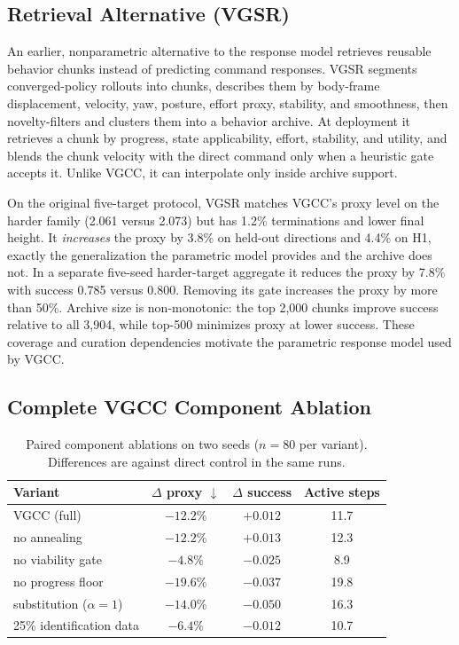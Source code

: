 \subsection{Retrieval Alternative (VGSR)}
\label{app:retrieval}

An earlier, nonparametric alternative to the response model retrieves reusable
behavior chunks instead of predicting command responses. VGSR segments
converged-policy rollouts into chunks, describes them by body-frame displacement,
velocity, yaw, posture, effort proxy, stability, and smoothness, then
novelty-filters and clusters them into a behavior archive. At deployment it
retrieves a chunk by progress, state applicability, effort, stability, and utility,
and blends the chunk velocity with the direct command only when a heuristic gate
accepts it. Unlike VGCC, it can interpolate only inside archive support.

On the original five-target protocol, VGSR matches VGCC's proxy level on the harder
family (2.061 versus 2.073) but has 1.2\% terminations and lower final height. It
\emph{increases} the proxy by 3.8\% on held-out directions and 4.4\% on H1, exactly
the generalization the parametric model provides and the archive does not. In a
separate five-seed harder-target aggregate it reduces the proxy by 7.8\% with
success 0.785 versus 0.800. Removing its gate increases the proxy by more than
50\%. Archive size is non-monotonic: the top 2,000 chunks improve success relative
to all 3,904, while top-500 minimizes proxy at lower success. These coverage and
curation dependencies motivate the parametric response model used by VGCC.

\subsection{Complete VGCC Component Ablation}
\label{app:ablation}

\begin{table}[h]
\centering
\caption{Paired component ablations on two seeds ($n=80$ per variant). Differences are against direct control in the same runs.}
\label{tab:vgcc-ablation}
\begin{tabular}{lccc}
\toprule
Variant & $\Delta$ proxy $\downarrow$ & $\Delta$ success & Active steps \\
\midrule
VGCC (full) & $-12.2\%$ & $+0.012$ & 11.7 \\
no annealing & $-12.2\%$ & $+0.013$ & 12.3 \\
no viability gate & $-4.8\%$ & $-0.025$ & 8.9 \\
no progress floor & $-19.6\%$ & $-0.037$ & 19.8 \\
substitution ($\alpha=1$) & $-14.0\%$ & $-0.050$ & 16.3 \\
25\% identification data & $-6.4\%$ & $-0.012$ & 10.7 \\
\bottomrule
\end{tabular}
\end{table}

